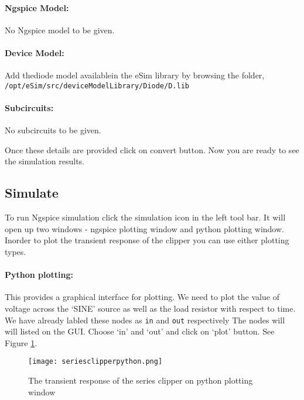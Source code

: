 \paragraph{Ngspice Model:} No Ngspice model to be given.

\paragraph{Device Model:} Add thediode model availablein the eSim library by browsing the folder, \texttt{/opt/eSim/src/deviceModelLibrary/Diode/D.lib}

\paragraph{Subcircuits:} No subcircuits to be given.

\noindent Once these details are provided click on convert button.  Now you are ready to see the simulation results.


\paragraph{}
\subsection{Simulate} To run Ngspice simulation click the simulation icon in the left tool bar. It will open up two windows - ngspice plotting window and python plotting window. Inorder to plot the transient response of the clipper you can use either plotting types.

\paragraph{Python plotting:}This provides a graphical interface for plotting. We need to plot the value of voltage across the `SINE' source as well as the load resistor with respect to time. We have already labled these nodes as \texttt{in} and \texttt{out} respectively The nodes will will listed on the GUI. Choose  `in' and `out' and click on `plot' button. See Figure \ref{seriesclipperpython}.

\begin{figure}[h]
\centering
\texttt{[image: seriesclipperpython.png]}
\caption{The transient response of the series clipper on python plotting window}
\label{seriesclipperpython}
\end{figure}

